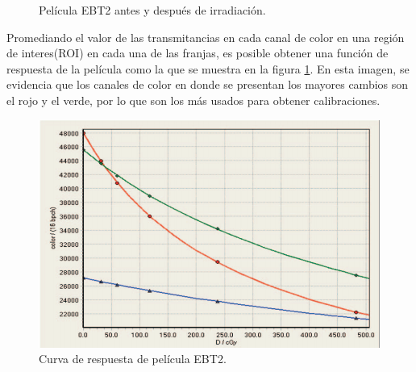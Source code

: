 \begin{figure}[H]
	\centering
	\hfill
	\caption{Película EBT2 antes y después de irradiación.}
\end{figure}

Promediando el valor de las transmitancias en cada canal de color en una región de interes(ROI) en cada una de las franjas, es posible obtener una función de respuesta de la película como la que se muestra en la figura \ref{fig:curvaRespuesta}. En esta imagen, se evidencia que los canales de color en donde se presentan los mayores cambios son el rojo y el verde, por lo que son los más usados para obtener calibraciones.\\

\begin{figure}[H]
	\centering
	\includegraphics[width=0.5\linewidth]{images/respses.png}
	\caption{Curva de respuesta de película EBT2\cite{manualEBT2}.}
	\label{fig:curvaRespuesta}
\end{figure}

